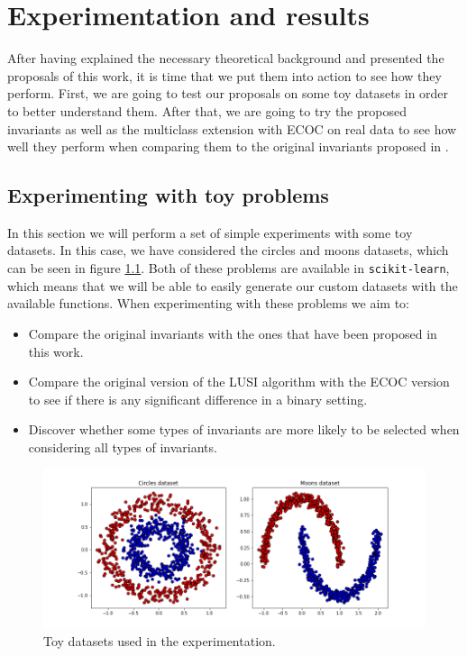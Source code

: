 \chapter{Experimentation and results}
\label{Chapter4}

After having explained the necessary theoretical background and presented the proposals
of this work, it is time that we put them into action to see how they perform. First, we are going
to test our proposals on some toy datasets in order to better understand them. After that, we are going
to try the proposed invariants as well as the multiclass extension with ECOC on real data to see how
well they perform when comparing them to the original invariants proposed in \cite{Vapnik2019}.

\section{Experimenting with toy problems}

In this section we will perform a set of simple experiments with some toy datasets. In this case, we have
considered the circles and moons datasets, which can be seen in figure \ref{fig:toy_datasets}. Both of
these problems are available in \texttt{scikit-learn}, which means that we will be able to easily generate
our custom datasets with the available functions. When experimenting with these problems we aim to:

\begin{itemize}
    \item Compare the original invariants with the ones that have been proposed in this work.
    \item Compare the original version of the LUSI algorithm with the ECOC version to see if there is
    any significant difference in a binary setting.
    \item Discover whether some types of invariants are more likely to be selected when considering all types
    of invariants.
\end{itemize}

\begin{figure}[H]
    \centering
    \includegraphics[width=\textwidth]{thesis/Figures/toy_datasets.png}
    \caption{Toy datasets used in the experimentation.}
    \label{fig:toy_datasets}
\end{figure}

